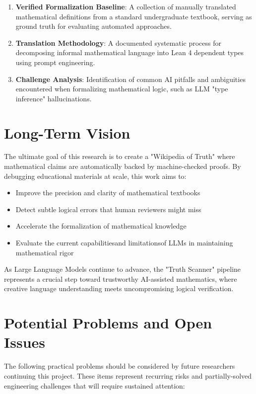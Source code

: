 \begin{enumerate}
    \item \textbf{Verified Formalization Baseline}: A collection of manually translated mathematical definitions from a standard undergraduate textbook, serving as ground truth for evaluating automated approaches.
    \item \textbf{Translation Methodology}: A documented systematic process for decomposing informal mathematical language into Lean 4 dependent types using prompt engineering.
    \item \textbf{Challenge Analysis}: Identification of common AI pitfalls and ambiguities encountered when formalizing mathematical logic, such as LLM "type inference" hallucinations.
\end{enumerate}

\section{Long-Term Vision}
\label{sec:vision}

The ultimate goal of this research is to create a "Wikipedia of Truth" where mathematical claims are automatically backed by machine-checked proofs. By debugging educational materials at scale, this work aims to:

\begin{itemize}
    \item Improve the precision and clarity of mathematical textbooks
    \item Detect subtle logical errors that human reviewers might miss
    \item Accelerate the formalization of mathematical knowledge
    \item Evaluate the current capabilities\textemdash and limitations\textemdash of LLMs in maintaining mathematical rigor
\end{itemize}

As Large Language Models continue to advance, the "Truth Scanner" pipeline represents a crucial step toward trustworthy AI-assisted mathematics, where creative language understanding meets uncompromising logical verification.

\section{Potential Problems and Open Issues}
\label{sec:open-issues}

The following practical problems should be considered by future researchers continuing this project. These items represent recurring risks and partially-solved engineering challenges that will require sustained attention:

